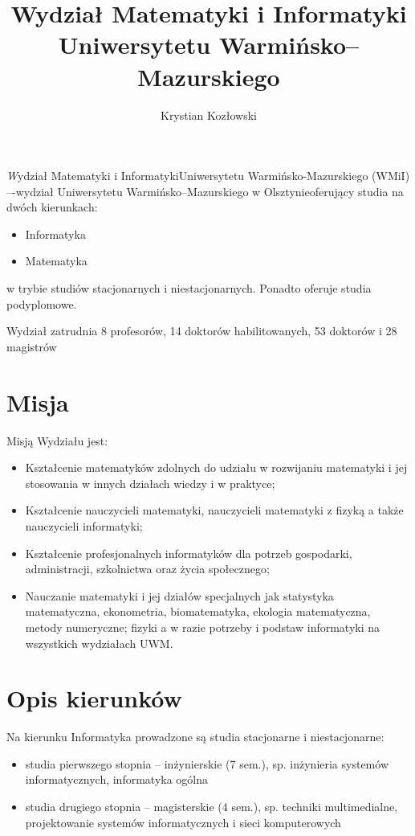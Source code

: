 ﻿\documentclass[a4paper,12pt]{article}
\title{Wydział Matematyki i Informatyki Uniwersytetu Warmińsko--Mazurskiego}
\author{Krystian Kozłowski}
\begin{document}
\maketitle

\emph Wydział Matematyki i Informatyki\newline Uniwersytetu Warmińsko-Mazurskiego (WMiI) –\newline -wydział
Uniwersytetu Warmińsko--Mazurskiego w Olsztynie\newline oferujący studia na dwóch kierunkach:
\begin{itemize}
\item Informatyka
\item Matematyka
\end{itemize}

w trybie studiów stacjonarnych i niestacjonarnych. Ponadto oferuje studia podyplomowe.

Wydział zatrudnia 8 profesorów, 14 doktorów habilitowanych, 53 doktorów i 28 magistrów


\tableofcontents

\section { Misja}

Misją Wydziału jest:

\begin{itemize}
\item Kształcenie matematyków zdolnych do udziału w rozwijaniu matematyki i jej stosowania w innych
działach wiedzy i w praktyce;
\item Kształcenie nauczycieli matematyki, nauczycieli matematyki z fizyką a także nauczycieli informatyki;
\item Kształcenie profesjonalnych informatyków dla potrzeb gospodarki, administracji, szkolnictwa oraz życia
społecznego;
\item Nauczanie matematyki i jej działów specjalnych jak statystyka matematyczna, ekonometria,
biomatematyka, ekologia matematyczna, metody numeryczne; fizyki a w razie potrzeby i podstaw
informatyki na wszystkich wydziałach UWM.
\end{itemize}
\section { Opis kierunków}
Na kierunku Informatyka prowadzone są studia stacjonarne i niestacjonarne:
\begin{itemize}
\item studia pierwszego stopnia – inżynierskie (7 sem.), sp. inżynieria systemów informatycznych, informatyka
ogólna
\item studia drugiego stopnia – magisterskie (4 sem.), sp. techniki multimedialne, projektowanie systemów
informatycznych i sieci komputerowych
\end{itemize}
\end{document}
